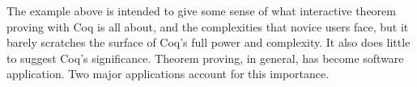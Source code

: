 \documentclass[11pt]{amsart}
\begin{document}
The example above is intended to give some sense of what interactive theorem proving with Coq is all about, and the complexities that novice users face, but it barely scratches the surface of Coq's full power and complexity.  It also does little to suggest Coq's significance.  Theorem proving, in general, has become software application.  Two major applications account for this importance.

%
%
%
%
%
%
%
%
\end{document}
